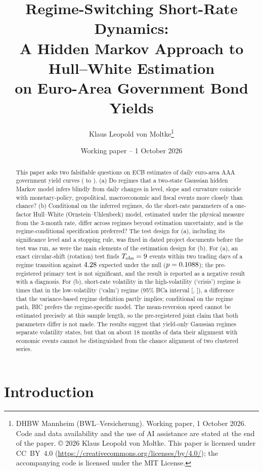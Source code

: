 \documentclass[11pt,a4paper]{article}
\title{Regime-Switching Short-Rate Dynamics:\\ A Hidden Markov Approach to Hull--White Estimation\\ on Euro-Area Government Bond Yields}
\author{Klaus Leopold von Moltke\thanks{DHBW Mannheim (BWL--Versicherung). Working paper, 1 October 2026. Code and data availability and the use of AI assistance are stated at the end of the paper. \copyright{} 2026 Klaus Leopold von Moltke. This paper is licensed under CC~BY~4.0 (\url{https://creativecommons.org/licenses/by/4.0/}); the accompanying code is licensed under the MIT License.}}
\date{Working paper -- 1 October 2026}
\begin{document}
\maketitle

\begin{abstract}
\noindent
This paper asks two falsifiable questions on ECB estimates of \NLevelDays{} daily euro-area AAA government yield curves (\StartLevel{} to \EndDate{}). (a) Do regimes that a two-state Gaussian hidden Markov model infers blindly from daily changes in level, slope and curvature coincide with \NEvents{} monetary-policy, geopolitical, macroeconomic and fiscal events more closely than chance? (b) Conditional on the inferred regimes, do the short-rate parameters of a one-factor Hull--White (Ornstein--Uhlenbeck) model, estimated under the physical measure from the 3-month rate, differ across regimes beyond estimation uncertainty, and is the regime-conditional specification preferred? The test design for (a), including its significance level and a stopping rule, was fixed in dated project documents before the test was run, as were the main elements of the estimation design for (b). For (a), an exact circular-shift (rotation) test finds $T_{\mathrm{obs}}=9$ events within two trading days of a regime transition against $4.28$ expected under the null ($p=0.1088$); the pre-registered primary test is not significant, and the result is reported as a negative result with a diagnosis. For (b), short-rate volatility in the high-volatility (`crisis') regime is \PtsRatio{} times that in the low-volatility (`calm') regime (95\% BCa interval [\CIsRatiolo, \CIsRatiohi]), a difference that the variance-based regime definition partly implies; conditional on the regime path, BIC prefers the regime-specific model. The mean-reversion speed cannot be estimated precisely at this sample length, so the pre-registered joint claim that both parameters differ is not made. The results suggest that yield-only Gaussian regimes separate volatility states, but that on about 18 months of data their alignment with economic events cannot be distinguished from the chance alignment of two clustered series.
\end{abstract}

\section{Introduction}\label{sec:intro}
\end{document}
